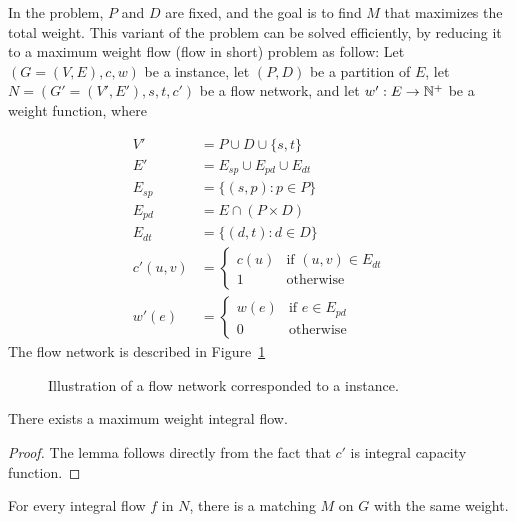 \label{sub:fixed}
In the \textsc{\FIXEDCARPOOL{}} problem, $P$ and $D$ are fixed, 
and the goal is to find $M$ that maximizes the total weight. 
This variant of the problem can be solved efficiently,
by reducing it to a maximum weight flow (flow in short) problem as
follow:
Let $(G = (V, E), c, w)$ be a \CARPOOL{} instance,
let $(P, D)$ be a partition of $E$,
let  $N = (G' = (V', E'), s, t, c')$ be a flow network, 
and let $w' : E \rightarrow \mathbb{N}^+$ be a weight function, where 

\begin{align*}
V'			& = P \cup D \cup \{s, t\}										\\
E'			& = E_{sp} \cup E_{pd} \cup E_{dt}								\\
E_{sp}		& =	\{(s, p) : p \in P \}										\\
E_{pd}		& =	E \cap (P \times D)											\\
E_{dt}		& =	\{(d, t) : d \in D \}										\\
c'(u, v)	& = 
				\begin{cases}
				c(u) & \text{if } (u, v) \in E_{dt} 						\\
				1 & \text{otherwise}
				\end{cases}
																			\\
w'(e)			& = 
				\begin{cases}
				w(e) & \text{if } e \in E_{pd} 								\\
				0 & \text{otherwise}	
				\end{cases}
\end{align*}
The flow network is described in Figure~\ref{fig:flow}
\begin{figure}
\centering

\caption{
\label{fig:flow}
Illustration of a flow network corresponded to a \FIXEDCARPOOL{} instance.}
\end{figure}

\begin{lemma}
There exists a maximum weight integral flow.
\end{lemma}

\begin{proof}
The lemma follows directly from the fact that $c'$ is integral capacity function.
\end{proof}

\begin{lemma}
For every integral flow $f$ in $N$, there is a matching $M$ on $G$ with the same weight. 
\end{lemma}

